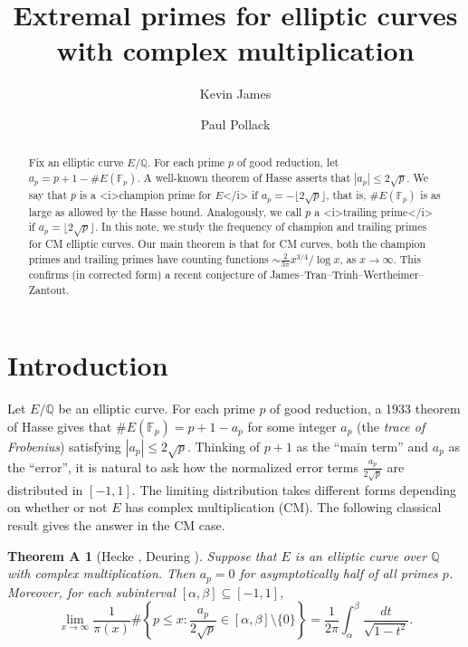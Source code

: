 \documentclass[12pt]{amsart}
\author{Kevin James}
\author{Paul Pollack}
\title{Extremal primes for elliptic curves with complex multiplication}
\newtheorem*{thmA}{Theorem A}
\theoremstyle{remark}
\begin{document}
\newcommand\Z{\mathbb{Z}}
\newcommand\Q{\mathbb{Q}}
\newcommand\lcm{\mathrm{lcm}}
\newcommand{\leg}[2]{\genfrac{(}{)}{}{}{#1}{#2}}


\renewcommand{\labelenumi}{(\roman{enumi})}
\newcommand\N{\mathbb{N}}
\newcommand\R{\mathbb{R}}
\newcommand\Ss{\mathcal{S}}
\newcommand\Pp{\mathcal{P}}
\newcommand\F{\mathbb{F}}
\let\vv\v
\newcommand\ca{\chi_{\mathrm{td}}}
\renewcommand\v{\nu}
\renewcommand\subset{\subseteq}
\newcommand\Oo{\mathcal{O}}
\newcommand\Qq{\mathcal{Q}}

\begin{abstract} Fix an elliptic curve $E/\Q$. For each prime $p$ of good reduction, let $a_p = p+1-\#E(\F_p)$. A well-known theorem of Hasse asserts that $|a_p| \le 2\sqrt{p}$. We say that $p$ is a <i>champion prime for $E$</i> if $a_p= -\lfloor 2\sqrt{p}\rfloor$, that is, $\#E(\F_p)$ is as large as allowed by the Hasse bound. Analogously, we call $p$ a <i>trailing prime</i> if $a_p = \lfloor 2\sqrt{p}\rfloor$. In this note, we study the frequency of  champion and trailing primes for CM elliptic curves. Our main theorem is that for CM curves, both the champion primes and trailing primes have counting functions $\sim \frac{2}{3\pi} x^{3/4}/\log{x}$, as $x\to\infty$. This confirms (in corrected form) a recent conjecture of James--Tran--Trinh--Wertheimer--Zantout.
\end{abstract}

\maketitle
\section{Introduction}
Let $E/\Q$ be an elliptic curve. For each prime $p$ of good reduction, a 1933 theorem of Hasse gives that $\#E(\F_p) = p+1-a_p$ for some integer $a_p$ (the \emph{trace of Frobenius}) satisfying $|a_p| \le 2\sqrt{p}$. Thinking of $p+1$ as the ``main term'' and $a_p$ as the ``error'', it is natural to ask how the normalized error terms $\frac{a_p}{2\sqrt{p}}$ are distributed in $[-1,1]$. The limiting distribution takes different forms depending on whether or not $E$ has complex multiplication (CM). The following classical result gives the answer in the CM case.

\begin{thmA}[Hecke \cite{hecke18,hecke20}, Deuring \cite{deuring53,deuring55,deuring56,deuring57}] Suppose that $E$ is an elliptic curve over $\Q$ with complex multiplication. Then $a_p=0$ for asymptotically half of all primes $p$. Moreover, for each subinterval $[\alpha,\beta]\subset [-1,1]$,
\[ \lim_{x\to\infty} \frac{1}{\pi(x)} \#\left\{p\le x: \frac{a_p}{2\sqrt{p}} \in [\alpha,\beta]\setminus\{0\}\right\} = \frac{1}{2\pi} \int_{\alpha}^{\beta} \frac{dt}{\sqrt{1-t^2}}.\]
\end{thmA}
\end{document}
